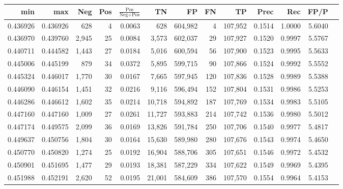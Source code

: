 \begin{tabular}{rrrrrrrrrrrrr}
\toprule
     min &      max &   Neg &   Pos & $\frac{\text{Pos}}{\text{Neg}+\text{Pos}}$ &      TN &      FP &      FN &      TP &   Prec &    Rec &   FP/P \\
\midrule
0.436926 & 0.436926 &   628 &     4 &                                     0.0063 &     628 & 604,982 &       4 & 107,952 & 0.1514 & 1.0000 & 5.6040 \\
0.436970 & 0.439760 & 2,945 &    25 &                                     0.0084 &   3,573 & 602,037 &      29 & 107,927 & 0.1520 & 0.9997 & 5.5767 \\
0.440711 & 0.444582 & 1,443 &    27 &                                     0.0184 &   5,016 & 600,594 &      56 & 107,900 & 0.1523 & 0.9995 & 5.5633 \\
0.445006 & 0.445199 &   879 &    34 &                                     0.0372 &   5,895 & 599,715 &      90 & 107,866 & 0.1524 & 0.9992 & 5.5552 \\
0.445324 & 0.446017 & 1,770 &    30 &                                     0.0167 &   7,665 & 597,945 &     120 & 107,836 & 0.1528 & 0.9989 & 5.5388 \\
0.446090 & 0.446154 & 1,451 &    32 &                                     0.0216 &   9,116 & 596,494 &     152 & 107,804 & 0.1531 & 0.9986 & 5.5253 \\
0.446286 & 0.446612 & 1,602 &    35 &                                     0.0214 &  10,718 & 594,892 &     187 & 107,769 & 0.1534 & 0.9983 & 5.5105 \\
0.447160 & 0.447160 & 1,009 &    27 &                                     0.0261 &  11,727 & 593,883 &     214 & 107,742 & 0.1536 & 0.9980 & 5.5012 \\
0.447174 & 0.449575 & 2,099 &    36 &                                     0.0169 &  13,826 & 591,784 &     250 & 107,706 & 0.1540 & 0.9977 & 5.4817 \\
0.449637 & 0.450756 & 1,804 &    30 &                                     0.0164 &  15,630 & 589,980 &     280 & 107,676 & 0.1543 & 0.9974 & 5.4650 \\
0.450770 & 0.450820 & 1,274 &    25 &                                     0.0192 &  16,904 & 588,706 &     305 & 107,651 & 0.1546 & 0.9972 & 5.4532 \\
0.450901 & 0.451695 & 1,477 &    29 &                                     0.0193 &  18,381 & 587,229 &     334 & 107,622 & 0.1549 & 0.9969 & 5.4395 \\
0.451988 & 0.452191 & 2,620 &    52 &                                     0.0195 &  21,001 & 584,609 &     386 & 107,570 & 0.1554 & 0.9964 & 5.4153 \\

\end{tabular}
